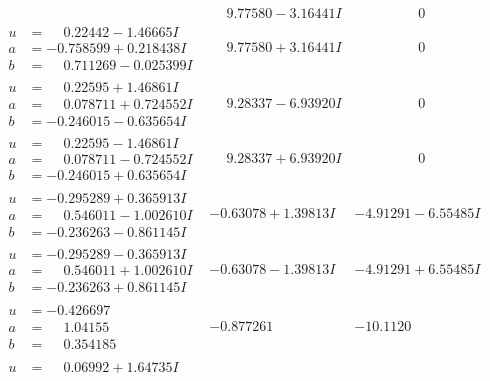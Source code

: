 \documentclass[1p]{elsarticle_modified}
\theoremstyle{definition}
\begin{document}
$$\begin{array}{c|c|c}
 & \phantom{-}9.77580 - 3.16441 I & \phantom{-0.000000 } 0 \\ \hline\begin{aligned}
u &= \phantom{-}0.22442 - 1.46665 I \\
a &= -0.758599 + 0.218438 I \\
b &= \phantom{-}0.711269 - 0.025399 I\end{aligned}
 & \phantom{-}9.77580 + 3.16441 I & \phantom{-0.000000 } 0 \\ \hline\begin{aligned}
u &= \phantom{-}0.22595 + 1.46861 I \\
a &= \phantom{-}0.078711 + 0.724552 I \\
b &= -0.246015 - 0.635654 I\end{aligned}
 & \phantom{-}9.28337 - 6.93920 I & \phantom{-0.000000 } 0 \\ \hline\begin{aligned}
u &= \phantom{-}0.22595 - 1.46861 I \\
a &= \phantom{-}0.078711 - 0.724552 I \\
b &= -0.246015 + 0.635654 I\end{aligned}
 & \phantom{-}9.28337 + 6.93920 I & \phantom{-0.000000 } 0 \\ \hline\begin{aligned}
u &= -0.295289 + 0.365913 I \\
a &= \phantom{-}0.546011 - 1.002610 I \\
b &= -0.236263 - 0.861145 I\end{aligned}
 & -0.63078 + 1.39813 I & -4.91291 - 6.55485 I \\ \hline\begin{aligned}
u &= -0.295289 - 0.365913 I \\
a &= \phantom{-}0.546011 + 1.002610 I \\
b &= -0.236263 + 0.861145 I\end{aligned}
 & -0.63078 - 1.39813 I & -4.91291 + 6.55485 I \\ \hline\begin{aligned}
u &= -0.426697\phantom{ +0.000000I} \\
a &= \phantom{-}1.04155\phantom{ +0.000000I} \\
b &= \phantom{-}0.354185\phantom{ +0.000000I}\end{aligned}
 & -0.877261\phantom{ +0.000000I} & -10.1120\phantom{ +0.000000I} \\ \hline\begin{aligned}
u &= \phantom{-}0.06992 + 1.64735 I \\

\end{aligned}
\end{array}$$
\end{document}
